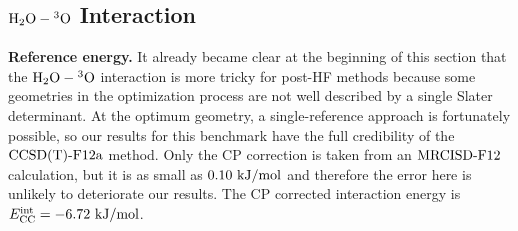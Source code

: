 \subsection{$\mbox{\ensuremath{\text H _2 \text O-\hspace{.2pt} ^3\text{O}}}$ Interaction}

\textbf{Reference energy.} It already became clear at the beginning of this
section that the $\mbox{\ensuremath{\text H _2 \text O-\hspace{.2pt} ^3\text{O}}}$ interaction is more tricky for post-HF methods because
some geometries in the optimization process are not well described by a single
Slater determinant. At the optimum geometry, a single-reference approach is
fortunately possible, so our results for this benchmark have the full
credibility of the $\text{CCSD(T)-F12a}$ method. Only the CP correction is taken from an
$\text{MRCISD-F12}$ calculation, but it is as small as \mbox{$0.10\ \text {kJ/mol}$} and therefore
the error here is unlikely to deteriorate our results. The CP corrected
interaction energy is \mbox{$\ecc=-6.72\ \kmo$}.


